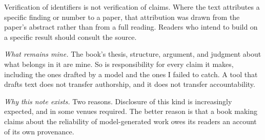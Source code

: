 Verification of identifiers is not verification of claims. Where the text
attributes a specific finding or number to a paper, that attribution was drawn
from the paper's abstract rather than from a full reading. Readers who intend to
build on a specific result should consult the source.

\vspace{0.5em}
\noindent
\textit{What remains mine.}
The book's thesis, structure, argument, and judgment about what belongs in it are
mine. So is responsibility for every claim it makes, including the ones drafted by
a model and the ones I failed to catch. A tool that drafts text does not transfer
authorship, and it does not transfer accountability.

\vspace{0.5em}
\noindent
\textit{Why this note exists.}
Two reasons. Disclosure of this kind is increasingly expected, and in some venues
required. The better reason is that a book making claims about the reliability of
model-generated work owes its readers an account of its own provenance.

